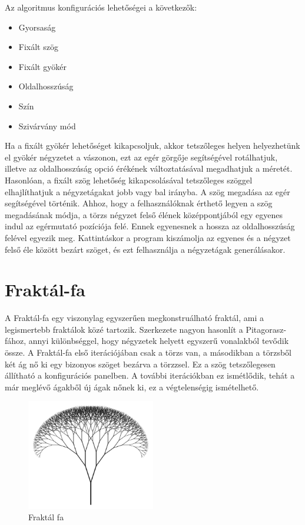 \par Az algoritmus konfigurációs lehetőségei a következők:
\begin{itemize}
	\item Gyorsaság
	\item Fixált szög
	\item Fixált gyökér
	\item Oldalhosszúság
	\item Szín
	\item Szivárvány mód
\end{itemize}
Ha a fixált gyökér lehetőséget kikapcsoljuk, akkor tetszőleges helyen helyezhetünk el gyökér négyzetet a vászonon, ezt az egér görgője segítségével rotálhatjuk, illetve az oldalhosszúság opció érékének változtatásával megadhatjuk a méretét. Hasonlóan, a fixált szög lehetőség kikapcsolásával tetszőleges szöggel elhajlíthatjuk a négyzetágakat jobb vagy bal irányba. A szög megadása az egér segítségével történik. Ahhoz, hogy a felhasználóknak érthető legyen a szög megadásának módja, a törzs négyzet felső élének középpontjából egy egyenes indul az egérmutató pozíciója felé. Ennek egyenesnek a hossza az oldalhosszúság felével egyezik meg. Kattintáskor a program kiszámolja az egyenes és a négyzet felső éle között bezárt szöget, és ezt felhasználja a négyzetágak generálásakor.
\section{Fraktál-fa}
A Fraktál-fa egy viszonylag egyszerűen megkonstruálható fraktál, ami a legismertebb fraktálok közé tartozik. Szerkezete nagyon hasonlít a Pitagorasz-fához, annyi különbséggel, hogy négyzetek helyett egyszerű vonalakból tevődik össze. A Fraktál-fa első iterációjában csak a törzs van, a másodikban a törzsből két ág nő ki egy bizonyos szöget bezárva a törzzsel. Ez a szög tetszőlegesen állítható a konfigurációs panelben. A további iterációkban ez ismétlődik, tehát a már meglévő ágakből új ágak nőnek ki, ez a végtelenségig ismételhető.  
\begin{figure}[!ht]
	\begin{center}
		\includegraphics[width=0.5\textwidth]{img/FractalTree}
		\caption[labelInTOC]{Fraktál fa}
	\end{center}
\end{figure}
